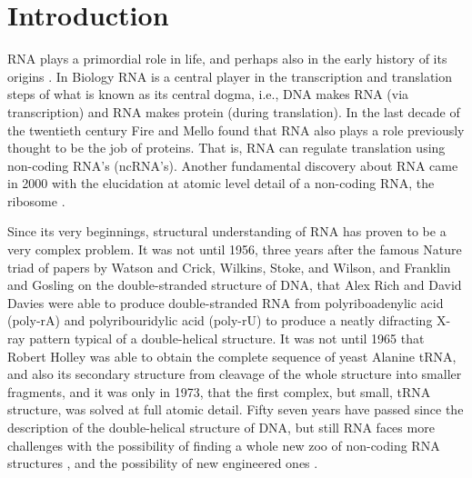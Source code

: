 \chapter{Introduction}
\label{introduction} 

RNA plays  a primordial role  in life, and  perhaps also in  the early
history   of  its   origins  \cite{woese1967,   crick1968,  orgel1968,
  orgel2004}. In Biology RNA is  a central player in the transcription
and translation steps of what is known as its central dogma, i.e., DNA
makes  RNA   (via  transcription)   and  RNA  makes   protein  (during
translation).
In  the  last   decade  of  the  twentieth  century   Fire  and  Mello
\cite{fire1998} found that RNA also plays a role previously thought to
be the  job of proteins. That  is, RNA can  regulate translation using
non-coding  RNA's (ncRNA's). Another  fundamental discovery  about RNA
came  in  2000  with the  elucidation  at  atomic  level detail  of  a
non-coding   RNA,    the   ribosome   \cite{schluenzen2000,   ban2000,
  wimberly2000}.

Since its very beginnings,  structural understanding of RNA has proven
to be a very complex problem. It was not until 1956, three years after
the famous Nature triad of papers by Watson and Crick, Wilkins, Stoke,
and  Wilson,  and  Franklin  and  Gosling  \cite{watson1953a}  on  the
double-stranded structure of DNA, that Alex Rich and David Davies were
able  to  produce   double-stranded  RNA  from  polyriboadenylic  acid
(poly-rA)  and polyribouridylic  acid  (poly-rU) to  produce a  neatly
difracting X-ray pattern typical of a double-helical structure. It was
not  until 1965 that  Robert Holley  was able  to obtain  the complete
sequence of yeast Alanine tRNA,  and also its secondary structure from
cleavage of  the whole  structure into smaller  fragments, and  it was
only in 1973,  that the first complex, but  small, tRNA structure, was
solved at full atomic detail.  Fifty seven years have passed since the
description  of the  double-helical structure  of DNA,  but  still RNA
faces more challenges with the  possibility of finding a whole new zoo
of non-coding RNA  structures \cite{weinberg2009}, and the possibility
of new engineered ones \cite{severcan2009}.

